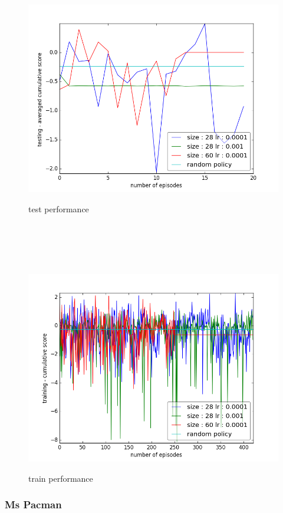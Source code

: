 \documentclass{report}
\begin{document}
\begin{figure}[H]
\begin{minipage}[c]{.49\linewidth}
	\centering
	\includegraphics[width = \linewidth]{plots/b3/Boxing-v3/testScoreMean.png}
	\caption{test performance}
    \end{minipage}
    \hfill%
\begin{minipage}[c]{.49\linewidth}
    \centering 
    \includegraphics[width = \linewidth]{plots/b3/Boxing-v3/trainScore.png}
	\caption{train performance}
\end{minipage}
\end{figure}

\subsubsection*{Ms Pacman}
\end{document}
